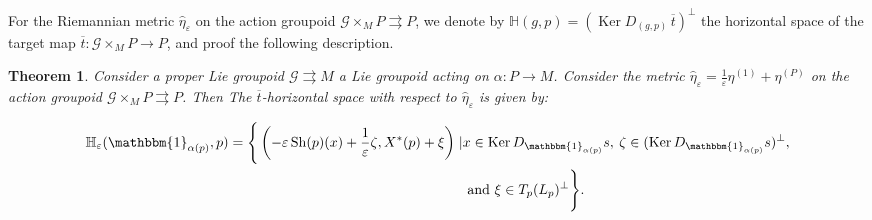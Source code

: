 \documentclass[12pt,a4paper,reqno]{amsart}
\DeclareMathOperator{\kernel}{Ker}
\DeclareMathOperator{\Sh}{Sh} %
\newcommand{\1}{\mathbbm{1}} %
\newcommand{\G}{\mathcal{G}} %
\newcommand{\Hor}{\mathbb{H}} %
\newtheorem{thm}{Theorem}[section]
\theoremstyle{definition}
\theoremstyle{TheoremNum}
\begin{document}
For the Riemannian metric $\widehat{\eta}_\varepsilon$ on the action groupoid $\G \times_M P\rightrightarrows P$, we denote by $\Hor(g,p) = (\kernel D_{(g,p)}\,\overline{t})^\perp$ the horizontal space of the target map $\overline{t}\colon \G \times_M P\to P$, and proof the following description. 

\begin{thm}\th\label{T: bar(t)-Horizontal distribution}
Consider a proper Lie groupoid $\G\rightrightarrows M$ a Lie groupoid acting on $\alpha\colon P\to M$. Consider the metric $\widehat{\eta}_\varepsilon = \frac{1}{\varepsilon}\eta^{(1)}+\eta^{(P)}$ on the action groupoid $\G\times_M P\rightrightarrows P$. Then The $\overline{t}$-horizontal space with respect to $\widehat{\eta}_\varepsilon$ is given by:
\begin{linenomath}
\begin{align*}
\Hor_\varepsilon(\1_{\alpha(p)},p) = \Bigg\{\left(-\varepsilon\Sh(p)(x)+\frac{1}{\varepsilon}\zeta,X^\ast(p)+\xi\right)\mid& x\in \kernel D_{\1_{\alpha(p)}} s,\: \zeta\in (\kernel D_{\1_{\alpha(p)}} s)^\perp,\\
 &\mbox{ and } \xi\in  T_p(L_p)^\perp\Bigg\}.
\end{align*}
\end{linenomath}
\end{thm}
\end{document}
